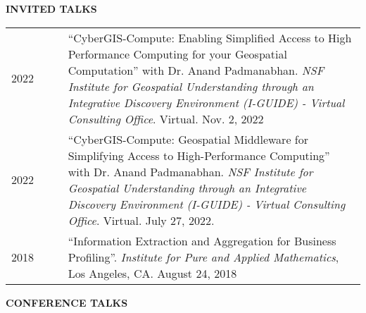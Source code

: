 \documentclass{acmcv}
\begin{document}

    \textbf{\uppercase{Invited Talks}}

    \begin{longtable}{p{0.16\linewidth} p{0.84\linewidth}}
        2022 & ``CyberGIS-Compute: Enabling Simplified Access to High Performance Computing for your Geospatial Computation'' with Dr. Anand Padmanabhan. \textit{NSF Institute for Geospatial Understanding through an Integrative Discovery Environment (I-GUIDE) - Virtual Consulting Office}. Virtual. Nov. 2, 2022\\

        2022 & ``CyberGIS-Compute: Geospatial Middleware for Simplifying Access to High-Performance Computing'' with Dr. Anand Padmanabhan. \textit{NSF Institute for Geospatial Understanding through an Integrative Discovery Environment (I-GUIDE) - Virtual Consulting Office}. Virtual. July 27, 2022. \\

        2018 & ``Information Extraction and Aggregation for Business Profiling''. \textit{Institute for Pure and Applied Mathematics}, Los Angeles, CA. August 24, 2018 \\

    \end{longtable}

    \pagebreak
	\textbf{\uppercase{Conference Talks}}
\end{document}
